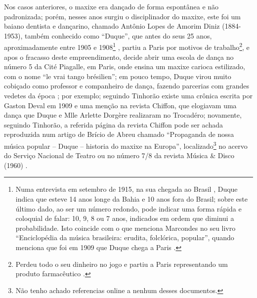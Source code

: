 
Nos casos anteriores, o maxixe era dançado de forma espontânea e não padronizada;
porém, nesses anos surgiu
o disciplinador do maxixe, este foi um baiano dentista e dançarino, 
chamado Antônio Lopes de Amorim Diniz (1884-1953), também conhecido como ``Duque'', 
que antes do seus 25 anos, 
aproximadamente entre 1905 e 1908\footnote{Numa 
entrevista em setembro de 1915, na sua chegada ao Brasil \cite[pp. 1]{maxixeparis1915:0}, 
Duque indica que esteve 14 anos longe da Bahia e 10 anos fora do Brasil;
sobre este último dado, ao ser um número redondo, 
pode indicar uma forma rápida e coloquial de falar: 
 10, 9, 8 ou 7 anos, indicados em ordem que diminui a probabilidade.
Isto coincide com o que menciona Marcondes no seu livro 
``Enciclopédia da música brasileira: erudita, folclórica, popular'',
quando menciona que foi em 1909 que Duque chega a Paris \cite[pp. 242]{marcondes1977enciclopedia}.} 
\cite[pp. 1]{maxixeparis1915:0} \cite[pp. 130]{efege1974maxixe} \cite[pp. 82-83]{tinhorao1986pequena} \cite[pp. 242]{marcondes1977enciclopedia},
partiu a Paris por motivos de trabalho\footnote{Perdeu 
todo o seu dinheiro no jogo e partiu a Paris representando 
um produto farmacêutico \cite[pp. 82]{tinhorao1986pequena}.}, e apos o fracasso deste empreendimento,
decide abrir uma escola de dança no número 5 da Cité Piagalle, em Paris, onde ensina um maxixe carioca estilizado,
com o nome ``le vrai tango brésilien''; em pouco tempo, 
Duque virou muito cobiçado como professor e companheiro de dança,
fazendo parcerias com grandes vedetes da época \cite[pp. 82]{tinhorao1986pequena} \cite[pp. 131]{efege1974maxixe}; 
por exemplo; seguindo Tinhorão \cite[pp. 82]{tinhorao1986pequena} 
existe uma crônica escrita por Gaston Deval em 1909 e uma menção na revista Chiffon,
que elogiavam uma dança que Duque e Mlle Arlette Dorgère realizaram no Trocadéro;
novamente, seguindo Tinhorão, a referida página da revista Chiffon pode ser achada
reproduzida num artigo de Brício de Abreu chamado 
``Propaganda de nossa música popular -- Duque -- historia do maxixe na Europa'',
localizado\footnote{Não tenho achado referencias online a nenhum desses documentos.} 
no acervo do Serviço Nacional de Teatro ou 
no número 7/8 da revista  Música \& Disco (1960) \cite[pp. 94]{tinhorao1986pequena}.


